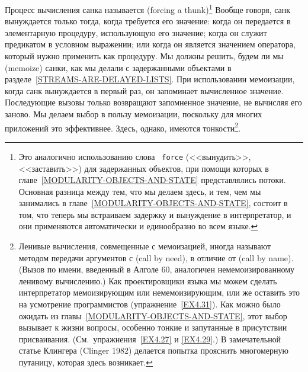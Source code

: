 Процесс вычисления санка называется 
(forcing a thunk)\footnote{Это аналогично использованию слова {\tt 
force}
(<<вынудить>>, <<заставить>>) для задержанных объектов, при
помощи которых в главе~\ref{MODULARITY-OBJECTS-AND-STATE}
представлялись потоки.  Основная разница между тем, что мы делаем
здесь, и тем, чем мы занимались в 
главе~\ref{MODULARITY-OBJECTS-AND-STATE}, состоит в том, что теперь мы
встраиваем задержку и вынуждение в интерпретатор, и они
применяются автоматически и единообразно во всем языке.}
Вообще говоря, санк вынуждается только тогда, когда требуется его
значение: когда он передается в элементарную процедуру, использующую
его значение; когда он служит предикатом в условном
выражении; или когда он является значением оператора, который нужно
применить как процедуру.  Мы должны решить, будем ли 
мы 
 (memoize) санки, как мы делали с задержанными объектами в 
разделе~\ref{STREAMS-ARE-DELAYED-LISTS}.  При использовании мемоизации,
когда санк вынуждается в первый раз, он запоминает
вычисленное значение.  Последующие вызовы только возвращают
запомненное значение, не вычисляя его заново.  Мы делаем выбор
в пользу мемоизации, поскольку для многих приложений это
эффективнее.  Здесь, однако, имеются тонкости\footnote{Ленивые 
вычисления, совмещенные с мемоизацией, иногда
называют методом передачи аргументов с  (call by need), в отличие от  (call by name). (Вызов по имени, введенный в Алголе 60, аналогичен
немемоизированному ленивому вычислению.)  Как проектировщики языка
мы можем сделать интерпретатор мемоизирующим или немемоизирующим,
или же оставить это на усмотрение программистов (упражнение~\ref{EX4.31}).
Как можно было ожидать из 
главы~\ref{MODULARITY-OBJECTS-AND-STATE}, этот выбор вызывает к жизни
вопросы, особенно тонкие и запутанные в присутствии присваивания. 
(См.~упражнения~\ref{EX4.27} и \ref{EX4.29}.)  В замечательной статье Клингера
(Clinger 1982) делается попытка прояснить
многомерную путаницу, которая здесь возникает.}.


